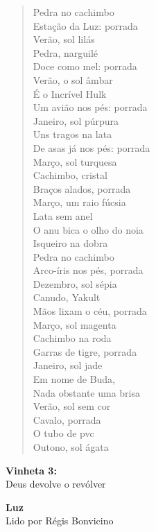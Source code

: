 \begin{verse}
Pedra no cachimbo\\
Estação da Luz: porrada\\
Verão, sol lilás\\[5pt]
Pedra, narguilé\\
Doce como mel: porrada\\
Verão, o sol âmbar\\[5pt]
É o Incrível Hulk\\
Um avião nos pés: porrada\\
Janeiro, sol púrpura\\[5pt]
Uns tragos na lata\\
De asas já nos pés: porrada\\
Março, sol turquesa\\[5pt]
Cachimbo, cristal\\
Braços alados, porrada\\
Março, um raio fúcsia\\[5pt]
Lata sem anel\\
O anu bica o olho do noia\\
Isqueiro na dobra\\[5pt]
Pedra no cachimbo\\
Arco-íris nos pés, porrada\\
Dezembro, sol sépia\\[5pt]
Canudo, Yakult\\
Mãos lixam o céu, porrada\\
Março, sol magenta\\[5pt]
Cachimbo na roda\\
Garras de tigre, porrada\\
Janeiro, sol jade\\[5pt]
Em nome de Buda,\\
Nada obstante uma brisa\\
Verão, sol sem cor\\[5pt]
Cavalo, porrada\\
O tubo de pvc\\
Outono, sol ágata
\end{verse}

\pagebreak

\textbf{Vinheta 3:}\\
Deus devolve o revólver

\textbf{Luz}\\
Lido por Régis Bonvicino

